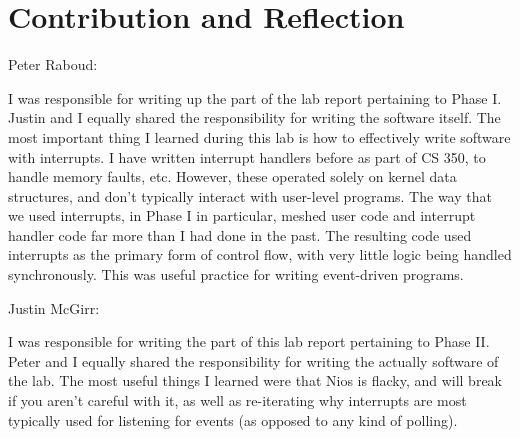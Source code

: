 \documentclass[12pt]{article}
\begin{document}
\newpage
\section{Contribution and Reflection}
Peter Raboud:

I was responsible for writing up the part of the lab report pertaining to Phase I.
Justin and I equally shared the responsibility for writing the software itself.
The most important thing I learned during this lab is how to effectively write
software with interrupts.
I have written interrupt handlers before as part of CS 350, to handle memory
faults, etc.
However, these operated solely on kernel data structures, and don't typically
interact with user-level programs.
The way that we used interrupts, in Phase I in particular, meshed user code and
interrupt handler code far more than I had done in the past.
The resulting code used interrupts as the primary form of control flow, with
very little logic being handled synchronously.
This was useful practice for writing event-driven programs.

Justin McGirr:

I was responsible for writing the part of this lab report pertaining to Phase II.
Peter and I equally shared the responsibility for writing the actually software
of the lab. The most useful things I learned were that Nios is flacky, and
will break if you aren't careful with it, as well as re-iterating why interrupts
are most typically used for listening for events (as opposed to any kind of
polling).
\end{document}
